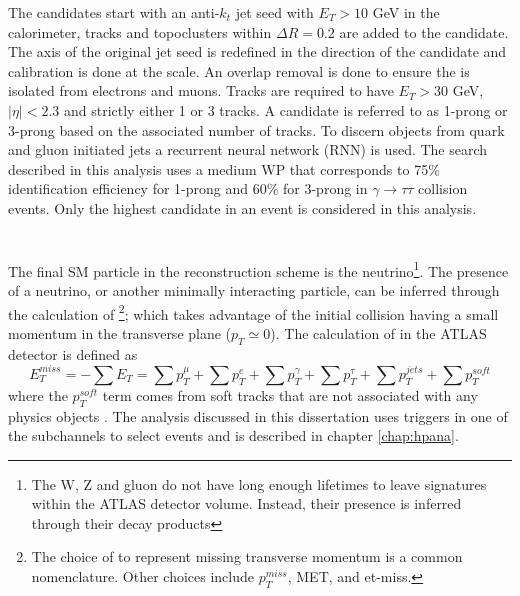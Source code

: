 	The \tauhad candidates start with an anti-$k_t$ jet seed with $E_T>10$ GeV in the calorimeter, tracks and topoclusters within $\Delta R = 0.2$ are added to the \tauhad candidate. The axis of the original jet seed is redefined in the direction of the \tauhad candidate and calibration is done at the \tauhad scale. An overlap removal is done to ensure the \tauhad is isolated from electrons and muons. Tracks are required to have $E_{T}>30$ GeV, $|\eta|<2.3$ and strictly either 1 or 3 tracks. A \tauhad candidate is referred to as 1-prong or 3-prong based on the associated number of tracks. To discern \tauhad objects from quark and gluon initiated jets a recurrent neural network (RNN) is used. The search described in this analysis uses a medium WP that corresponds to 75\% identification efficiency for 1-prong and 60\% for 3-prong in $\gamma \rightarrow \tau \tau$ collision events. Only the highest \pt \tauhad candidate in an event is considered in this analysis.

	\section{\Etm}\label{sec:reco-etmiss}
	The final SM particle in the reconstruction scheme is the neutrino\footnote{The W, Z and gluon do not have long enough lifetimes to leave signatures within the ATLAS detector volume. Instead, their presence is inferred through their decay products}. The presence of a neutrino, or another minimally interacting particle, can be inferred through the calculation of \Etm\footnote{The choice of \Etm to represent missing transverse momentum is a common nomenclature. Other choices include $p_{T}^{miss}$, MET, and et-miss.}; which takes advantage of the initial collision having a small momentum in the transverse plane ($p_{T} \simeq 0$). The calculation of \Etm in the ATLAS detector is defined as
	\begin{equation}\label{eqn:etmiss}
	E_{T}^{miss} = - \sum E_{T} = \sum p_{T}^{\mu} + \sum p_{T}^{e} + \sum p_{T}^{\gamma} + \sum p_{T}^{\tau} + \sum p_{T}^{jets} + \sum p_{T}^{soft}
	\end{equation}
	where the $p_{T}^{soft}$ term comes from soft tracks that are not associated with any physics objects \cite{met-perf}. The analysis discussed in this dissertation uses \Etm triggers in one of the subchannels to select events and is described in chapter \ref{chap:hpana}.